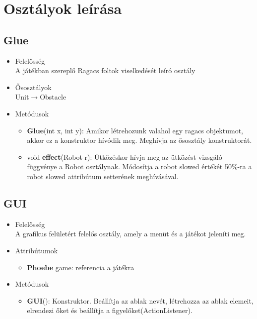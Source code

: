 \section{Osztályok leírása}
\subsection{Glue}
\begin{itemize}
\item Felelősség\\
A játékban szereplő Ragacs foltok viselkedését leíró osztály
\item Ősosztályok\\
Unit$\rightarrow$Obstacle
\item Metódusok
	\begin{itemize}
	    \item \textbf{Glue}(int x, int y): Amikor létrehozunk valahol egy ragacs objektumot, akkor ez a konstruktor hívódik meg. Meghívja az ősosztály konstruktorát.
		\item void \textbf{effect}(Robot r): Ütközéskor hívja meg az ütközést vizsgáló függvénye a Robot osztálynak. Módosítja a robot slowed értékét 50\%-ra a robot slowed attribútum setterének meghívásával.
	\end{itemize}
\end{itemize}

\subsection{GUI}
\begin{itemize}
\item Felelősség\\
A grafikus felületért felelős osztály, amely a menüt és a játékot jeleníti meg.
\item Attribútumok
	\begin{itemize}
		\item \textbf{Phoebe} game: referencia a játékra
	\end{itemize}
\item Metódusok
	\begin{itemize}
		\item\textbf{GUI}(): Konstruktor. Beállítja az ablak nevét, létrehozza az ablak elemeit, elrendezi őket és beállítja a figyelőket(ActionListener).
	\end{itemize}
\end{itemize}

